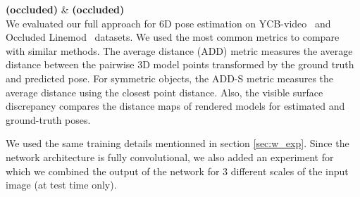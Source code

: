 \documentclass[letterpaper, 10 pt, conference]{ieeeconf}  %
\begin{document}
\textbf{(occluded)} & \textbf{(occluded)}\\%
We evaluated our full approach for 6D pose estimation on YCB-video~\cite{xiang2017posecnn} and Occluded Linemod~\cite{krull2015learning} datasets. We used the most common metrics to compare with similar methods. The average distance (ADD) metric \cite{hinterstoisser2012model} measures the average distance between the pairwise 3D model points transformed by the ground truth and predicted pose. For symmetric objects, the ADD-S metric measures the average distance using the closest point distance. Also, the visible surface discrepancy \cite{hodan2018bop} compares the distance maps of rendered models for estimated and ground-truth poses.

We used the same training details mentionned in section \ref{sec:w_exp}. Since the network architecture is fully convolutional, we also added an experiment for which we combined the output of the network for 3 different scales of the input image (at test time only).
\end{document}
